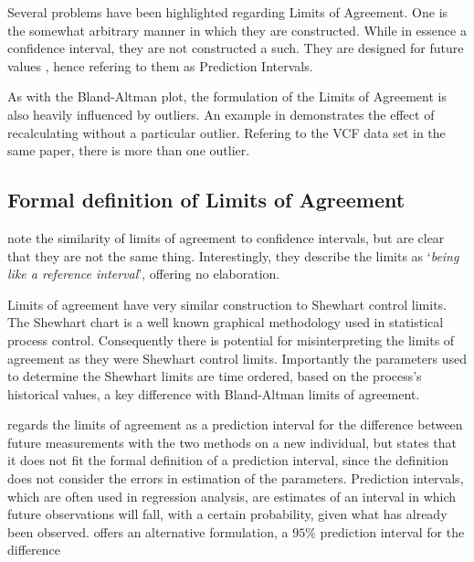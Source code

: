 \documentclass[12pt, a4paper]{report}
\theoremstyle{plain}
\theoremstyle{definition}
\theoremstyle{remark}
\begin{document}


Several problems have been highlighted regarding Limits of
Agreement. One is the somewhat arbitrary manner in which they are
constructed. While in essence a confidence interval, they are not
constructed a such. They are designed for future values , hence \citet{BXC2008} refering to them as Prediction Intervals.

As with the Bland-Altman plot, the formulation of the Limits of Agreement is also heavily influenced by outliers. An example
in \citet*{BA83} demonstrates the effect of recalculating without
a particular outlier. Refering to the VCF data set in the same
paper, there is more than one outlier.


\subsection{Formal definition of Limits of Agreement}

\citet{BA99} note the similarity of limits of agreement to
confidence intervals, but are clear that they are not the same thing. Interestingly, they describe the limits as `\textit{being like a reference interval}', offering no elaboration.



Limits of agreement have very similar construction to Shewhart control limits. The Shewhart chart is a well known graphical
methodology used in statistical process control. Consequently there is potential for misinterpreting the limits of agreement as
they were Shewhart control limits. Importantly the parameters used to determine the Shewhart limits are time ordered, based on the process's historical values, a key difference with Bland-Altman limits of agreement.

\citet{BXC2008} regards the limits of agreement as a prediction interval for the difference between future measurements with the
two methods on a new individual, but states that it does not fit the formal definition of a prediction interval, since the definition does not consider the errors in estimation of the parameters. Prediction intervals, which are often used in regression analysis, are estimates of an interval in which future observations will fall, with a certain probability, given what has
already been observed. \citet{BXC2008} offers an alternative formulation, a $95\%$ prediction interval for the difference
\end{document}
